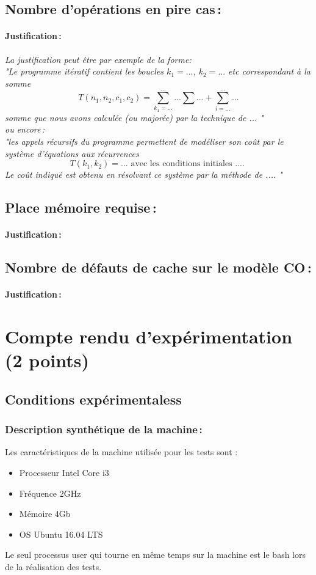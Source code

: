 \documentclass[a4paper, 10pt, french]{article}
\begin{document}
  \subsection{Nombre  d'opérations en pire cas\,: }
    \paragraph{Justification\,: }
    {\em La justification peut être par exemple de la forme: \\ 
       "Le programme itératif contient les boucles $k_1=...$, $k_2= ...$ etc correspondant à la somme 
      $$T(n_1, n_2, c_1, c_2) = \sum_{k_1=...}^{...} ... \sum ... + \sum_{i=...}^{...} ...$$ 
      somme que nous avons calculée (ou majorée) par la technique de  ... " \\
      ou  encore\,:  \\
      "les appels récursifs du programme permettent de modéliser son coût par le système d'équations aux récurrences 
      $$T(k_1, k_2) = ...  \mbox{~avec~les~conditions~initiales~....~} $$
      Le coût indiqué est obtenu en résolvant ce système par la méthode de  .... "
    } 
  \subsection{Place mémoire requise\,: }
    \paragraph{Justification\,: }

  \subsection{Nombre de défauts de cache sur le modèle CO\,: }
    \paragraph{Justification\,: }


\section{Compte rendu d'expérimentation (2 points)}
  \subsection{Conditions expérimentaless}
    \subsubsection{Description synthétique de la machine\,:} 
      Les caractéristiques de la machine utilisée pour les tests sont :
      \begin{itemize}
       \item Processeur Intel Core i3
       \item Fréquence 2GHz
       \item Mémoire 4Gb
       \item OS Ubuntu 16.04 LTS
      \end{itemize}
      Le seul processus user qui tourne en même temps sur la machine est le bash lors de la réalisation des tests.
\end{document}

